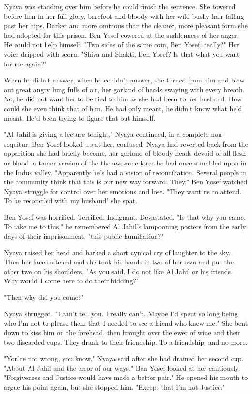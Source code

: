 \documentclass{amsart}
\begin{document}
Nyaya was standing over him before he could finish the sentence. She towered before him in her full glory, barefoot and bloody with her wild bushy hair falling past her hips. Darker and more ominous than the cleaner, more pleasant form she had adopted for this prison. Ben Yosef cowered at the suddenness of her anger. He could not help himself. "Two sides of the same coin, Ben Yosef, really?" Her voice dripped with scorn. "Shiva and Shakti, Ben Yosef? Is that what you want for me again?"

When he didn't answer, when he couldn't answer, she turned from him and blew out great angry lung fulls of air, her garland of heads swaying with every breath. No, he did not want her to be tied to him as she had been to her husband. How could she even think that of him. He had only meant, he didn't know what he'd meant. He'd been trying to figure that out himself.

"Al Jahil is giving a lecture tonight," Nyaya continued, in a complete non-sequitur. Ben Yosef looked up at her, confused. Nyaya had reverted back from the apparition she had briefly become, her garland of bloody heads devoid of all flesh or blood, a tamer version of the the awesome force he had once stumbled upon in the Indus valley. "Apparently he's had a vision of reconciliation. Several people in the community think that this is our new way forward. They," Ben Yosef watched Nyaya struggle for control over her emotions and lose. "They want us to attend. To be reconciled with my husband" she spat.

Ben Yosef was horrified. Terrified. Indignant. Devastated. "Is that why you came. To take me to this," he remembered Al Jahil's lampooning posters from the early days of their imprisonment, "this public humiliation?"

Nyaya raised her head and barked a short cynical cry of laughter to the sky. Then her face softened and she took his hands in two of her own and put the other two on his shoulders. "As you said. I do not like Al Jahil or his friends. Why would I come here to do their bidding?"

"Then why did you come?"

Nyaya shrugged. "I can't tell you. I really can't. Maybe I'd spent so long being who I'm not to please them that I needed to see a friend who knew me." She bent down to kiss him on the forehead, then brought over the ewer of wine and their two discarded cups. They drank to their friendship. To a friendship, and no more. 

"You're not wrong, you know," Nyaya said after she had drained her second cup. "About Al Jahil and the error of our ways." Ben Yosef looked at her cautiously. "Forgiveness and Justice would have made a better pair." He opened his mouth to argue his point again, but she stopped him. "Except that I'm not Justice." 
\end{document}
